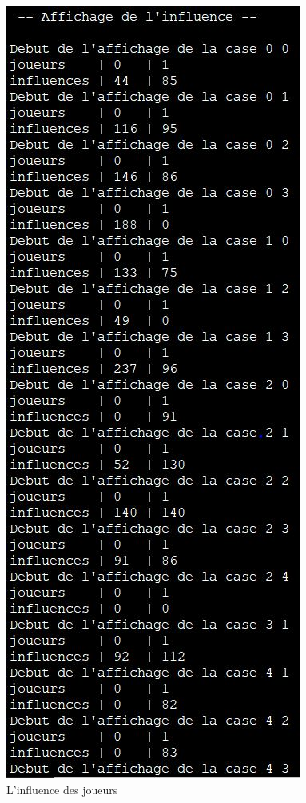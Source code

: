 \documentclass[a4paper]{article}
\begin{document}
\begin{itemize}
    \begin{figure}[h!]
        \centering
        \includegraphics[scale = 0.75]{influence.jpg}
      
        \caption{L'influence des joueurs}
        \label{influence}
    \end{figure}


\end{itemize}
\end{document}
